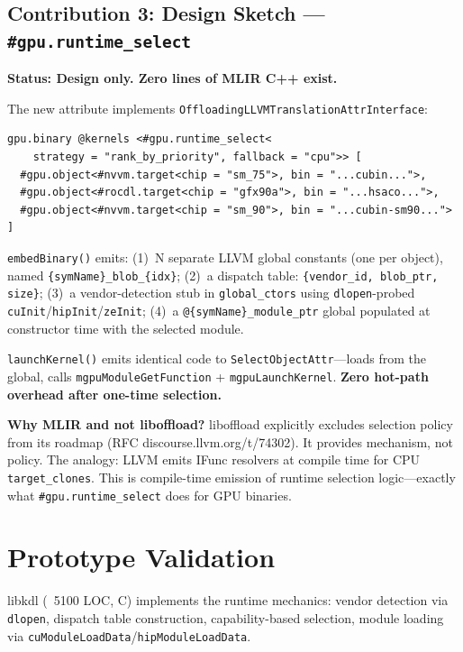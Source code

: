 \documentclass[11pt]{article}
\begin{document}
\subsection{Contribution 3: Design Sketch --- \texttt{\#gpu.runtime\_select}}

\textbf{Status: Design only. Zero lines of MLIR C++ exist.}

The new attribute implements \texttt{OffloadingLLVMTranslationAttrInterface}:

\begin{lstlisting}[language=MLIR]
gpu.binary @kernels <#gpu.runtime_select<
    strategy = "rank_by_priority", fallback = "cpu">> [
  #gpu.object<#nvvm.target<chip = "sm_75">, bin = "...cubin...">,
  #gpu.object<#rocdl.target<chip = "gfx90a">, bin = "...hsaco...">,
  #gpu.object<#nvvm.target<chip = "sm_90">, bin = "...cubin-sm90...">
]
\end{lstlisting}

\texttt{embedBinary()} emits:
(1)~N separate LLVM global constants (one per object), named \texttt{\{symName\}\_blob\_\{idx\}};
(2)~a dispatch table: \texttt{\{vendor\_id, blob\_ptr, size\}};
(3)~a vendor-detection stub in \texttt{global\_ctors} using \texttt{dlopen}-probed \texttt{cuInit}/\texttt{hipInit}/\texttt{zeInit};
(4)~a \texttt{@\{symName\}\_module\_ptr} global populated at constructor time with the selected module.

\texttt{launchKernel()} emits identical code to \texttt{SelectObjectAttr}---loads from the global, calls \texttt{mgpuModuleGetFunction} + \texttt{mgpuLaunchKernel}.
\textbf{Zero hot-path overhead after one-time selection.}

\textbf{Why MLIR and not liboffload?}
liboffload explicitly excludes selection policy from its roadmap (RFC discourse.llvm.org/t/74302).
It provides mechanism, not policy.
The analogy: LLVM emits IFunc resolvers at compile time for CPU \texttt{target\_clones}.
This is compile-time emission of runtime selection logic---exactly what \texttt{\#gpu.runtime\_select} does for GPU binaries.

\section{Prototype Validation}

libkdl (~5100 LOC, C) implements the runtime mechanics: vendor detection via \texttt{dlopen}, dispatch table construction, capability-based selection, module loading via \texttt{cuModuleLoadData}/\texttt{hipModuleLoadData}.
\end{document}
